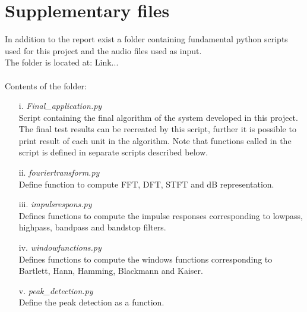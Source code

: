 \clearpage
\chapter{Supplementary files} \label{app:sup}
In addition to the report exist a folder containing fundamental python scripts used for this project and the audio files used as input. 
\\
The folder is located at: Link... \\
\\
Contents of the folder:
\begin{itemize}
\item[i.]\textit{Final\_application.py} \\
Script containing the final algorithm of the system developed in this project. The final test results can be recreated by this script, further it is possible to print result of each unit in the algorithm. Note that functions called in the script is defined in separate scripts described below.   

\item[ii.]\textit{fouriertransform.py}\\
Define function to compute FFT, DFT, STFT and dB representation.
 
\item[iii.] \textit{impulsrespons.py}\\
Defines functions to compute the impulse responses corresponding to lowpass, highpass, bandpass and bandstop filters.
\item[iv.] \textit{windowfunctions.py}\\
Defines functions to compute the windows functions corresponding to Bartlett, Hann, Hamming, Blackmann and Kaiser. 
\item[v.] \textit{peak\_detection.py} \\
Define the peak detection as a function.

\end{itemize}
